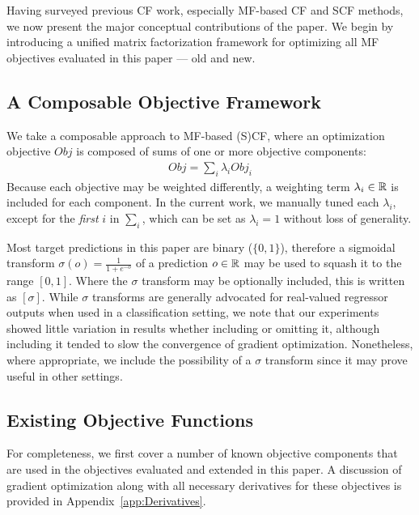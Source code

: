 Having surveyed previous CF work, especially MF-based CF and SCF
methods, we now present the major conceptual contributions of the
paper.  We begin by introducing a unified
matrix factorization framework for optimizing all MF objectives
evaluated in this paper --- old and new.

\subsection{A Composable Objective Framework}


We take a composable approach to MF-based (S)CF, where an optimization
objective $\mathit{Obj}$ is composed of sums of one or more objective
components:
\begin{align}
\mathit{Obj} = \sum_i \lambda_i \mathit{Obj}_i
\end{align}
Because each objective may be weighted differently, a weighting term
$\lambda_i \in \mathbb{R}$ is included for each component.  In the current
work, we manually tuned each $\lambda_i$, except for the \emph{first} 
$i$ in $\sum_i$, which can be set as $\lambda_i = 1$ without loss of
generality.

Most target predictions in this paper are binary ($\{0,1\}$),
therefore a sigmoidal transform $\sigma(o) = \frac{1}{1 + e^{-o}}$ of
a prediction $o \in \mathbb{R}$ may be used to squash it to the range $[0,
1]$.  Where the $\sigma$ transform may be optionally
included, this is written as $[\sigma]$.  While $\sigma$ transforms
are generally advocated for real-valued regressor outputs when used in
a classification setting, we note that our experiments showed little
variation in results whether including or omitting it, although
including it tended to slow the convergence of gradient optimization.
Nonetheless, where appropriate, we include the possibility of a
$\sigma$ transform since it may prove useful in other settings.

\subsection{Existing Objective Functions}

For completeness, we first cover a number of known objective
components that are used in the objectives evaluated and
extended in this paper.  A discussion of gradient optimization along
with all necessary derivatives for these objectives is provided in
Appendix~\ref{app:Derivatives}.

